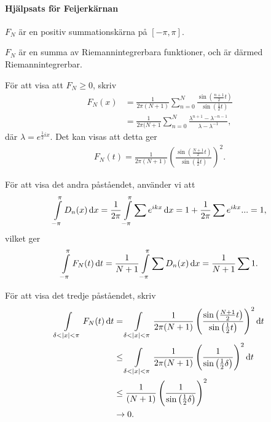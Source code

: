 \paragraph{Hjälpsats för Feijerkärnan}
$F_{N}$ är en positiv summationskärna på $[-\pi, \pi]$.

\proof
$F_{N}$ är en summa av Riemannintegrerbara funktioner, och är därmed Riemannintegrerbar.

För att visa att $F_{N} \geq 0$, skriv
\begin{align*}
	F_{N}(x) &= \frac{1}{2\pi(N + 1)}\sum\limits_{n = 0}^{N}\frac{\sin{\left(\frac{n + 1}{2}t\right)}}{\sin{\left(\frac{1}{2}t\right)}} \\
	         &= \frac{1}{2\pi(N + 1}\sum\limits_{n = 0}^{N}\frac{\lambda^{n + 1} - \lambda^{-n - 1}}{\lambda - \lambda^{-1}},
\end{align*}
där $\lambda = e^{\frac{1}{2}ix}$. Det kan visas att detta ger
\begin{align*}
	F_{N}(t) = \frac{1}{2\pi (N + 1)}\left(\frac{\sin{\left(\frac{N + 1}{2}t\right)}}{\sin{\left(\frac{1}{2}t\right)}}\right)^{2}.
\end{align*}

För att visa det andra påståendet, använder vi att
\begin{align*}
	\int\limits_{-\pi}^{\pi}D_{n}(x)\dd{x} = \frac{1}{2\pi}\int\limits_{-\pi}^{\pi}\sum\limits_{}^{}e^{ikx}\dd{x} = 1 + \frac{1}{2\pi}\sum\limits_{}^{}e^{ikx}... = 1,
\end{align*}
vilket ger
\begin{align*}
	\int\limits_{-\pi}^{\pi}F_{N}(t)\dd{t} = \frac{1}{N + 1}\int\limits_{-\pi}^{\pi}\sum\limits_{}^{}D_{n}(x)\dd{x} = \frac{1}{N + 1}\sum\limits_{}^{}1.
\end{align*}

För att visa det tredje påståendet, skriv
\begin{align*}
	\int\limits_{\delta < \abs{x} < \pi}^{}F_{N}(t)\dd{t} &= \int\limits_{\delta < \abs{x} < \pi}^{}\frac{1}{2\pi (N + 1)}\left(\frac{\sin{\left(\frac{N + 1}{2}t\right)}}{\sin{\left(\frac{1}{2}t\right)}}\right)^{2}\dd{t} \\
	                                                &\leq \int\limits_{\delta < \abs{x} < \pi}^{}\frac{1}{2\pi (N + 1)}\left(\frac{1}{\sin{\left(\frac{1}{2}\delta\right)}}\right)^{2}\dd{t} \\
	                                                &\leq \frac{1}{(N + 1)}\left(\frac{1}{\sin{\left(\frac{1}{2}\delta\right)}}\right)^{2} \\
	                                                &\to 0. 
\end{align*}


